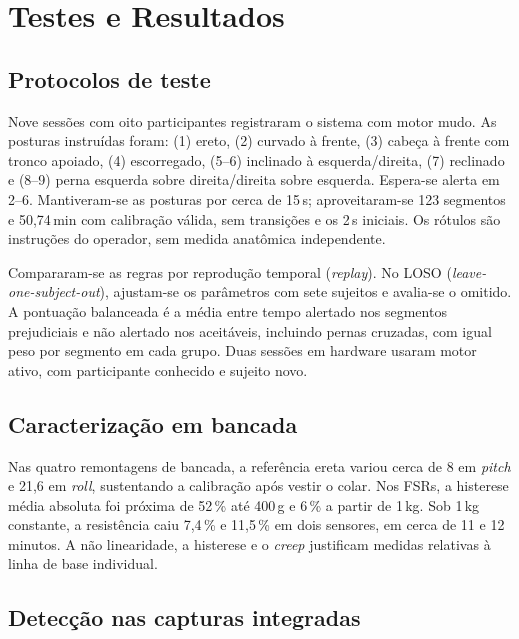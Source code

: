 \chapter{Testes e Resultados}\label{cap:resultados}

\section{Protocolos de teste}
\label{sec:res-protocolos}

Nove sessões com oito participantes registraram o sistema
com motor mudo. As posturas instruídas foram: (1) ereto, (2) curvado à
frente, (3) cabeça à frente com tronco apoiado, (4) escorregado,
(5--6) inclinado à esquerda/direita, (7) reclinado e (8--9) perna
esquerda sobre direita/direita sobre esquerda. Espera-se alerta em 2--6.
Mantiveram-se as posturas por cerca de 15\,s; aproveitaram-se 123 segmentos
e 50{,}74\,min com calibração válida, sem transições e os 2\,s iniciais.
Os rótulos são instruções do operador, sem medida anatômica independente.

Compararam-se as regras por reprodução temporal (\textit{replay}). No LOSO
(\textit{leave-one-subject-out}), ajustam-se os parâmetros com sete sujeitos
e avalia-se o omitido. A pontuação
balanceada é a média entre tempo alertado nos segmentos prejudiciais e
não alertado nos aceitáveis, incluindo pernas cruzadas, com igual peso por
segmento em cada grupo. Duas sessões em hardware usaram motor
ativo, com participante conhecido e sujeito novo.

\section{Caracterização em bancada}
\label{sec:res-bancada}

Nas quatro remontagens de bancada, a referência ereta variou cerca de
8\degree{} em \textit{pitch} e 21{,}6\degree{} em \textit{roll},
sustentando a calibração após vestir o colar. Nos FSRs, a histerese média
absoluta foi próxima de 52\,\% até 400\,g e 6\,\% a partir de 1\,kg.
Sob 1\,kg constante, a resistência caiu 7{,}4\,\% e 11{,}5\,\% em dois
sensores, em cerca de 11 e 12 minutos. A não linearidade, a histerese e o
\textit{creep} justificam medidas relativas à linha de base individual.

\section{Detecção nas capturas integradas}
\label{sec:res-deteccao}

